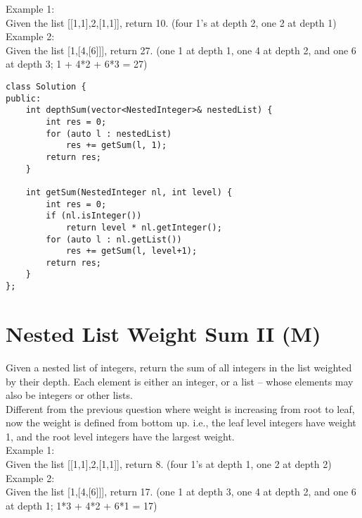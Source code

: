 Example 1:\\
Given the list [[1,1],2,[1,1]], return 10. (four 1's at depth 2, one 2 at depth 1)\\

Example 2:\\
Given the list [1,[4,[6]]], return 27. (one 1 at depth 1, one 4 at depth 2, and one 6 at depth 3; 1 + 4*2 + 6*3 = 27) \\
 
\begin{lstlisting}
class Solution {
public:
    int depthSum(vector<NestedInteger>& nestedList) {
        int res = 0;
        for (auto l : nestedList)
            res += getSum(l, 1);
        return res;
    }
        
    int getSum(NestedInteger nl, int level) {
        int res = 0;
        if (nl.isInteger())
            return level * nl.getInteger();
        for (auto l : nl.getList())
            res += getSum(l, level+1);
        return res;
    }
};
\end{lstlisting}


\section{Nested List Weight Sum II (M)}
Given a nested list of integers, return the sum of all integers in the list weighted by their depth. Each element is either an integer, or a list -- whose elements may also be integers or other lists.\\

Different from the previous question where weight is increasing from root to leaf, now the weight is defined from bottom up. i.e., the leaf level integers have weight 1, and the root level integers have the largest weight. \\

Example 1:\\
Given the list [[1,1],2,[1,1]], return 8. (four 1's at depth 1, one 2 at depth 2)\\

Example 2:\\
Given the list [1,[4,[6]]], return 17. (one 1 at depth 3, one 4 at depth 2, and one 6 at depth 1; 1*3 + 4*2 + 6*1 = 17)  \\

